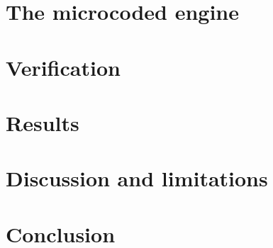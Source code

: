 \documentclass[conference]{IEEEtran}
\begin{document}
\section{The microcoded engine}\label{sec:engine}


\section{Verification}\label{sec:verif}


\section{Results}\label{sec:results}


\section{Discussion and limitations}\label{sec:discussion}


\section{Conclusion}




\end{document}

